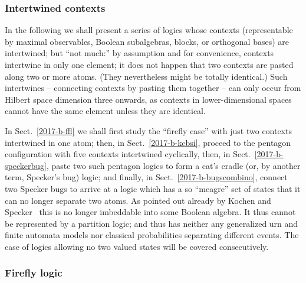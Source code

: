 \subsubsection{Intertwined contexts}

In the following we shall present a series of logics
whose contexts (representable by  maximal observables, Boolean subalgebras, blocks, or orthogonal bases)
are intertwined; but ``not much:'' by assumption and for convenience, contexts intertwine in only one element; it does not happen that two contexts
are  pasted~\cite{greechie:71,kalmbach-83,nav:91,pulmannova-91}
along two or more atoms. (They nevertheless might be totally identical.)
Such intertwines -- connecting contexts by pasting them together -- can only occur from Hilbert space dimension three onwards,
as contexts in lower-dimensional spaces  cannot have the same element unless they are identical.

In Sect.~\ref{2017-b-ffl} we shall first study the ``firefly case'' with just two contexts intertwined in one atom;
then, in Sect.~\ref{2017-b-kcbsi}, proceed to the pentagon configuration with five contexts intertwined cyclically,
then, in Sect.~\ref{2017-b-speckerbug}, paste two such pentagon logics to form a cat's cradle (or, by another term, Specker's bug) logic;
and finally, in Sect.~\ref{2017-b-bugscombino}, connect two Specker bugs to arrive at a logic which has a so ``meagre''
set of states that it can no longer separate two atoms.
As pointed out already by Kochen and Specker~\cite[p.~70,]{kochen1} this is no longer imbeddable into  some Boolean algebra.
It thus cannot be represented by a partition logic; and thus has neither any generalized urn and finite automata models
nor classical probabilities separating different events.
The case of logics allowing no two valued states will be covered consecutively.

\subsubsection*{Firefly logic}
\label{2017-b-ffl}




